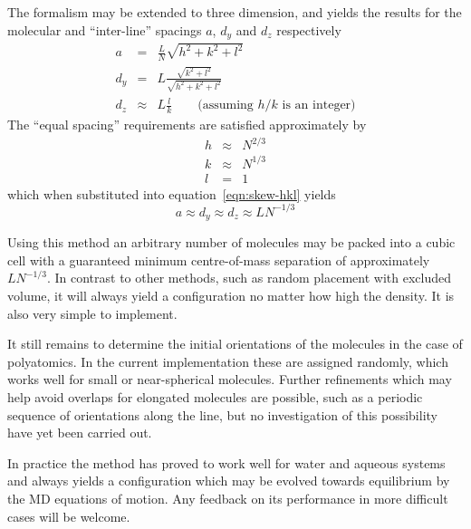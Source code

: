 \documentclass[twoside]{report}
\begin{document}
The formalism may be extended to three dimension, and yields the
results for the molecular and ``inter-line'' spacings $a$, $d_y$ and
$d_z$ respectively
\begin{eqnarray}
\label{eqn:skew-hkl}
\nonumber
a & = & \frac{L}{N}\sqrt{h^2+k^2+l^2}\\
d_y  & = & L \frac{\sqrt{k^2+l^2}}{\sqrt{h^2+k^2+l^2}} \\
d_z & \approx & L\frac{l}{k} \qquad\mbox{(assuming $h/k$ is an integer)}
\nonumber
\end{eqnarray}
The ``equal spacing'' requirements are satisfied approximately by
\begin{eqnarray}
  \nonumber
  h & \approx & N^{2/3} \\
  k & \approx & N^{1/3} \\
  \nonumber
  l & = & 1
\end{eqnarray}
which when substituted into equation~\ref{eqn:skew-hkl} yields
\begin{equation}
  a \approx d_y \approx d_z \approx LN^{-1/3}
\end{equation}

Using this method an arbitrary number of molecules may be packed into
a cubic cell with a guaranteed minimum centre-of-mass separation of
approximately $LN^{-1/3}$.  In contrast to other methods, such as
random placement with excluded volume, it will always yield a
configuration no matter how high the density.  It is also very simple
to implement.

It still remains to determine the initial orientations of the
molecules in the case of polyatomics.  In the current implementation
these are assigned randomly, which works well for small or
near-spherical molecules.  Further refinements which may help avoid
overlaps for elongated molecules are possible, such as a periodic
sequence of orientations along the line, but no investigation of this
possibility have yet been carried out.

In practice the method has proved to work well for water and aqueous
systems and always yields a configuration which may be evolved towards
equilibrium by the MD equations of motion.  Any feedback on its
performance in more difficult cases will be welcome.
\end{document}
